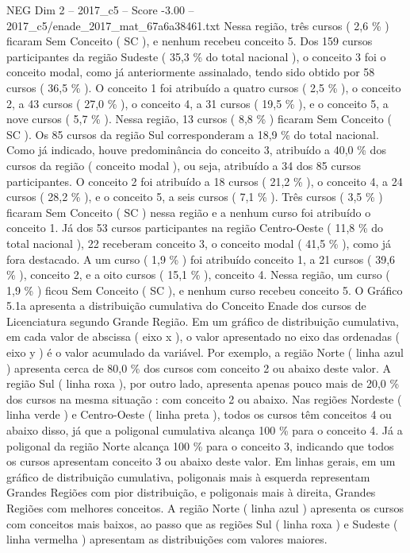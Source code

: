 \begin{textsample}{NEG Dim 2 – 2017\_c5 – Score -3.00 – 2017\_c5/enade\_2017\_mat\_67a6a38461.txt}
Nessa região, três cursos ( 2,6 \% ) ficaram Sem Conceito ( SC ), e nenhum recebeu conceito 5.
Dos 159 cursos participantes da região Sudeste ( 35,3 \% do total nacional ), o conceito 3 foi o conceito modal, como já anteriormente assinalado, tendo sido obtido por 58 cursos ( 36,5 \% ).
O conceito 1 foi atribuído a quatro cursos ( 2,5 \% ), o conceito 2, a 43 cursos ( 27,0 \% ), o conceito 4, a 31 cursos ( 19,5 \% ), e o conceito 5, a nove cursos ( 5,7 \% ).
Nessa região, 13 cursos ( 8,8 \% ) ficaram Sem Conceito ( SC ).
Os 85 cursos da região Sul corresponderam a 18,9 \% do total nacional.
Como já indicado, houve predominância do conceito 3, atribuído a 40,0 \% dos cursos da região ( conceito modal ), ou seja, atribuído a 34 dos 85 cursos participantes.
O conceito 2 foi atribuído a 18 cursos ( 21,2 \% ), o conceito 4, a 24 cursos ( 28,2 \% ), e o conceito 5, a seis cursos ( 7,1 \% ).
Três cursos ( 3,5 \% ) ficaram Sem Conceito ( SC ) nessa região e a nenhum curso foi atribuído o conceito 1.
Já dos 53 cursos participantes na região Centro-Oeste ( 11,8 \% do total nacional ), 22 receberam conceito 3, o conceito modal ( 41,5 \% ), como já fora destacado.
A um curso ( 1,9 \% ) foi atribuído conceito 1, a 21 cursos ( 39,6 \% ), conceito 2, e a oito cursos ( 15,1 \% ), conceito 4.
Nessa região, um curso ( 1,9 \% ) ficou Sem Conceito ( SC ), e nenhum curso recebeu conceito 5.
O Gráfico 5.1a apresenta a distribuição cumulativa do Conceito Enade dos cursos de Licenciatura segundo Grande Região.
Em um gráfico de distribuição cumulativa, em cada valor de abscissa ( eixo x ), o valor apresentado no eixo das ordenadas ( eixo y ) é o valor acumulado da variável.
Por exemplo, a região Norte ( linha azul ) apresenta cerca de 80,0 \% dos cursos com conceito 2 ou abaixo deste valor.
A região Sul ( linha roxa ), por outro lado, apresenta apenas pouco mais de 20,0 \% dos cursos na mesma situação : com conceito 2 ou abaixo.
Nas regiões Nordeste ( linha verde ) e Centro-Oeste ( linha preta ), todos os cursos têm conceitos 4 ou abaixo disso, já que a poligonal cumulativa alcança 100 \% para o conceito 4.
Já a poligonal da região Norte alcança 100 \% para o conceito 3, indicando que todos os cursos apresentam conceito 3 ou abaixo deste valor.
Em linhas gerais, em um gráfico de distribuição cumulativa, poligonais mais à esquerda representam Grandes Regiões com pior distribuição, e poligonais mais à direita, Grandes Regiões com melhores conceitos.
A região Norte ( linha azul ) apresenta os cursos com conceitos mais baixos, ao passo que as regiões Sul ( linha roxa ) e Sudeste ( linha vermelha ) apresentam as distribuições com valores maiores.

\end{textsample}
